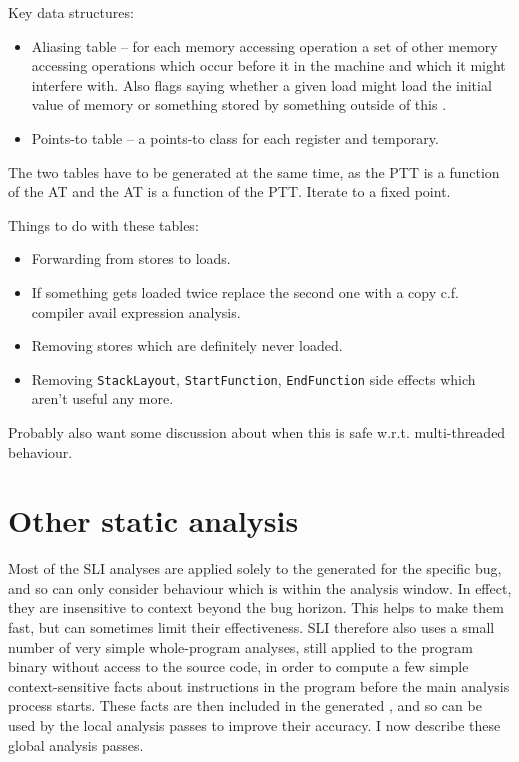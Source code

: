 Key data structures:

\begin{itemize}
\item
  Aliasing table -- for each memory accessing operation a set of other
  memory accessing operations which occur before it in the machine and
  which it might interfere with.  Also flags saying whether a given
  load might load the initial value of memory or something stored
  by something outside of this \StateMachine.
\item
  Points-to table -- a points-to class for each register and temporary.
\end{itemize}

The two tables have to be generated at the same time, as the PTT is a
function of the AT and the AT is a function of the PTT.  Iterate to a
fixed point.

Things to do with these tables:

\begin{itemize}
\item
  Forwarding from stores to loads.
\item
  If something gets loaded twice replace the second one with a copy
  c.f. compiler avail expression analysis.
\item
  Removing stores which are definitely never loaded.
\item
  Removing \verb|StackLayout|, \verb|StartFunction|,
  \verb|EndFunction| side effects which aren't useful any more.
\end{itemize}

Probably also want some discussion about when this is safe w.r.t.
multi-threaded behaviour.



\section{Other static analysis}

Most of the SLI analyses are applied solely to the \StateMachine
generated for the specific bug, and so can only consider behaviour
which is within the analysis window.  In effect, they are insensitive
to context beyond the bug horizon.  This helps to make them fast, but
can sometimes limit their effectiveness.  SLI therefore also uses a
small number of very simple whole-program analyses, still applied to
the program binary without access to the source code, in order to
compute a few simple context-sensitive facts about instructions in the
program before the main analysis process starts.  These facts are then
included in the generated \StateMachines, and so can be used by the
local analysis passes to improve their accuracy.  I now describe these
global analysis passes.


